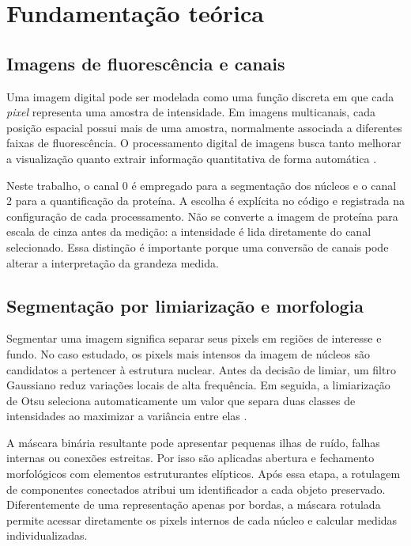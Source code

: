 \chapter{Fundamentação teórica}
\label{cap:fundamentacao}

\section{Imagens de fluorescência e canais}

Uma imagem digital pode ser modelada como uma função discreta em que cada \textit{pixel} representa uma amostra de intensidade. Em imagens multicanais, cada posição espacial possui mais de uma amostra, normalmente associada a diferentes faixas de fluorescência. O processamento digital de imagens busca tanto melhorar a visualização quanto extrair informação quantitativa de forma automática \cite{Gonzalez2018}.

Neste trabalho, o canal 0 é empregado para a segmentação dos núcleos e o canal 2 para a quantificação da proteína. A escolha é explícita no código e registrada na configuração de cada processamento. Não se converte a imagem de proteína para escala de cinza antes da medição: a intensidade é lida diretamente do canal selecionado. Essa distinção é importante porque uma conversão de canais pode alterar a interpretação da grandeza medida.

\section{Segmentação por limiarização e morfologia}
\label{sec:segmentacao-teoria}

Segmentar uma imagem significa separar seus pixels em regiões de interesse e fundo. No caso estudado, os pixels mais intensos da imagem de núcleos são candidatos a pertencer à estrutura nuclear. Antes da decisão de limiar, um filtro Gaussiano reduz variações locais de alta frequência. Em seguida, a limiarização de Otsu seleciona automaticamente um valor que separa duas classes de intensidades ao maximizar a variância entre elas \cite{Gonzalez2018}.

A máscara binária resultante pode apresentar pequenas ilhas de ruído, falhas internas ou conexões estreitas. Por isso são aplicadas abertura e fechamento morfológicos com elementos estruturantes elípticos. Após essa etapa, a rotulagem de componentes conectados atribui um identificador a cada objeto preservado. Diferentemente de uma representação apenas por bordas, a máscara rotulada permite acessar diretamente os pixels internos de cada núcleo e calcular medidas individualizadas.

